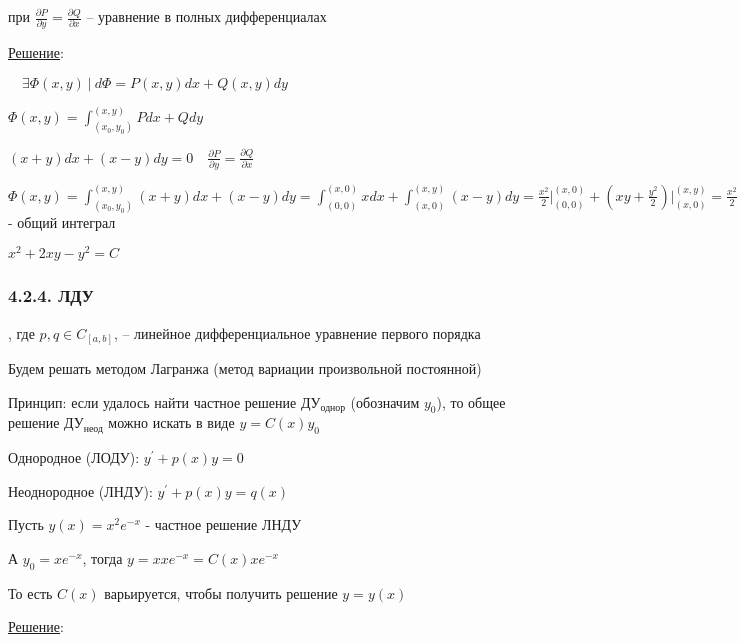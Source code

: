 \documentclass[12pt]{article}
\begin{document}
    \Def {} при $\frac{\partial P}{\partial y} = \frac{\partial Q}{\partial x}$ -- уравнение в полных дифференциалах

    \underline{Решение}: 
    
    \Mems {} $\quad \exists \Phi(x, y)\ | \ d\Phi = P(x, y)dx + Q(x, y)dy$

    $\Phi(x, y) = \int^{(x,y)}_{(x_0,y_0)} Pdx + Qdy$

    \Ex $(x + y)dx + (x - y)dy = 0 \quad \frac{\partial P}{\partial y} = \frac{\partial Q}{\partial x}$

    $\Phi(x, y) = \int^{(x, y)}_{(x_0,y_0)} (x + y)dx + (x - y)dy =
    \int^{(x,0)}_{(0,0)} xdx + \int^{(x,y)}_{(x,0)} (x - y)dy = \frac{x^2}{2} \Big|_{(0, 0)}^{(x, 0)} +
    \left(xy + \frac{y^2}{2}\right) \Big|_{(x, 0)}^{(x, y)} = \frac{x^2}{2} + xy - \frac{y^2}{2} + C$ - общий интеграл

    $x^2 + 2xy - y^2 = C$

    \mediumvspace

    \hypertarget{lineardifferentialequation}{}

    \subsubsection{4.2.4. ЛДУ}

    \Def {}, где $p, q \in C_{[a, b]}$, -- линейное дифференциальное уравнение первого порядка

    \hypertarget{methodLagrange}{}

    \Nota Будем решать методом Лагранжа (метод вариации произвольной постоянной)

    Принцип: если удалось найти частное решение ДУ$_\text{однор}$ (обозначим $y_0$), то общее решение ДУ$_\text{неод}$
    можно искать в виде $y = C(x)y_0$

    \Def Однородное (ЛОДУ): $y^\prime + p(x)y = 0$

    \Defs Неоднородное (ЛНДУ): $y^\prime + p(x)y = q(x)$

    \Ex Пусть $y(x) = x^2 e^{-x}$ - частное решение ЛНДУ

    А $y_0 = x e^{-x}$, тогда $y = x xe^{-x} = C(x) x e^{-x}$

    То есть $C(x)$ варьируется, чтобы получить решение $y = y(x)$

    \underline{Решение}: 
    
\end{document}
